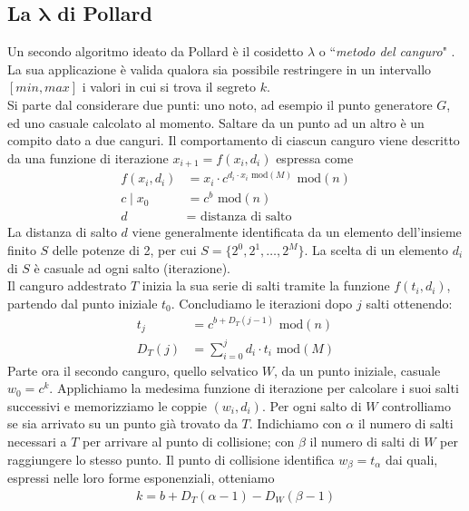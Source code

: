 \documentclass[a4paper,12pt]{tesiinfo}
\begin{document}
\subsection{La \texorpdfstring{$\mathbold{\lambda}$}{l} di Pollard}
Un secondo algoritmo ideato da Pollard \`e il cosidetto $\lambda$ o ``\textit{metodo del canguro}" \cite{pollard el-psy-kongru}. La sua applicazione \`e valida qualora sia possibile restringere in un intervallo $[min, max]$ i valori in cui si trova il segreto $k$.
\\
Si parte dal considerare due punti: uno noto, ad esempio il punto generatore $G$, ed uno casuale calcolato al momento. Saltare da un punto ad un altro \`e un compito dato a due canguri. Il comportamento di ciascun canguro viene descritto da una funzione di iterazione $x_{i+1}=f(x_i, d_i)$ espressa come
\begin{align*}
    f(x_i, d_i) &= x_i \cdot c^{d_i \cdot x_i \text{ mod}(M)} \text{ mod}(n)\\
    c \mid x_0 &= c^b \text{ mod}(n)\\
    d&=\text{ distanza di salto}
\end{align*}
La distanza di salto $d$ viene generalmente identificata \cite{el-psy 2} da un elemento dell'insieme finito $S$ delle potenze di 2, per cui $S=\{2^0, 2^1, \ldots, 2^M\}$. La scelta di un elemento $d_i$ di $S$ \`e casuale ad ogni salto (iterazione).
\\
Il canguro addestrato $T$ inizia la sua serie di salti tramite la funzione $f(t_i, d_i)$, partendo dal punto iniziale $t_0$. Concludiamo le iterazioni dopo $j$ salti ottenendo:
\begin{align*}
    t_j & = c^{b + D_T(j-1)} \text{ mod}(n)\\
    D_T(j) & =\sum_{i=0}^{j} d_i \cdot t_i \text{ mod}(M)
\end{align*}
Parte ora il secondo canguro, quello selvatico $W$, da un punto iniziale, casuale $w_0=c^k$. Applichiamo la medesima funzione di iterazione per calcolare i suoi salti successivi e memorizziamo le coppie $(w_i, d_i)$. Per ogni salto di $W$ controlliamo se sia arrivato su un punto gi\`a trovato da $T$. Indichiamo con $\alpha$ il numero di salti necessari a $T$ per arrivare al punto di collisione; con $\beta$ il numero di salti di $W$ per raggiungere lo stesso punto. Il punto di collisione identifica $w_\beta = t_\alpha$ dai quali, espressi nelle loro forme esponenziali, otteniamo 
\begin{gather}
    k = b + D_T(\alpha-1)-D_W(\beta-1)
    \label{k lambda1234}
\end{gather} 
\end{document}
